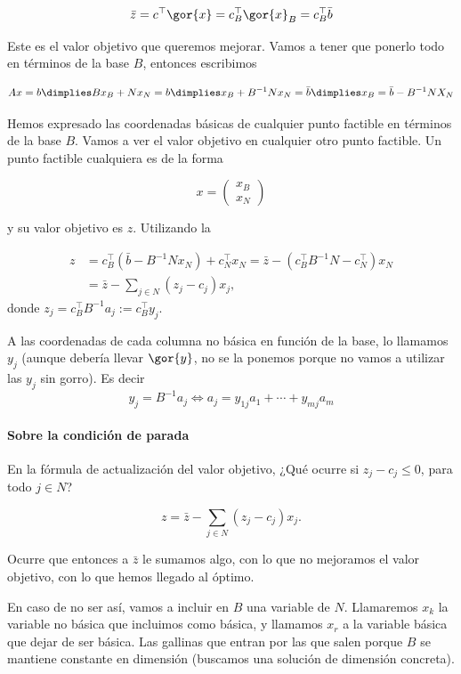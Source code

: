 \[\bar{z} = c^\top\gor{x} = c^\top_B\gor{x}_B = c^\top_B\bar{b}\]

Este es el valor objetivo que queremos mejorar. Vamos a tener que ponerlo todo en términos de la base $B$, entonces escribimos

\begin{equation}
\label{eq:SFB_simplex_expl_1}
Ax = b \dimplies Bx_B + Nx_N = b \dimplies x_B + B^{-1}Nx_N = \bar{b}\dimplies x_B = \bar{b} - B^{-1}NX_N
\end{equation}

Hemos expresado las coordenadas básicas de cualquier punto factible en términos de la base $B$.
Vamos a ver el valor objetivo en cualquier otro punto factible. Un punto factible cualquiera es de la forma

\[x= \begin{pmatrix}x_B\\\hline x_N\end{pmatrix}\]

y su valor objetivo es $z$. Utilizando la 

\begin{align*}
z &= c_B^\top (\bar{b}-B^{-1} N x_N)+c^\top_N x_N =
 \bar{z}-(c_B^\top B^{-1} N - c_N^\top)x_N\\
  &=\bar{z}- \sum_{j\in N} (z_j-c_j)x_j,
\end{align*}
donde $z_j = c_B^\top B^{-1} a_j:= c_B^\top y_j$.

A las coordenadas de cada columna no básica en función de la base, lo llamamos $y_j$ (aunque debería llevar $\gor{y}$, no se la ponemos porque no vamos a utilizar las $y_j$ sin gorro). Es decir
\[y_j=B^{-1} a_j\Leftrightarrow a_j = y_{1j} a_1+\cdots + y_{mj}a_m\]

\paragraph{Sobre la condición de parada}

En la fórmula de actualización del valor objetivo, ¿Qué ocurre si $z_j-c_j\leq 0$, para todo $j\in N$?

\[
z = \bar{z}- \sum_{j\in N} (z_j-c_j)x_j.
\]


Ocurre que entonces a $\bar{z}$ le sumamos algo, con lo que no mejoramos el valor objetivo, con lo que hemos llegado al óptimo.


En caso de no ser así, vamos a incluir en $B$ una variable de $N$. Llamaremos $x_k$ la variable no básica que incluimos como básica, y llamamos $x_r$ a la variable básica que dejar de ser básica. Las gallinas que entran por las que salen porque $B$ se mantiene constante en dimensión (buscamos una solución de dimensión concreta).

